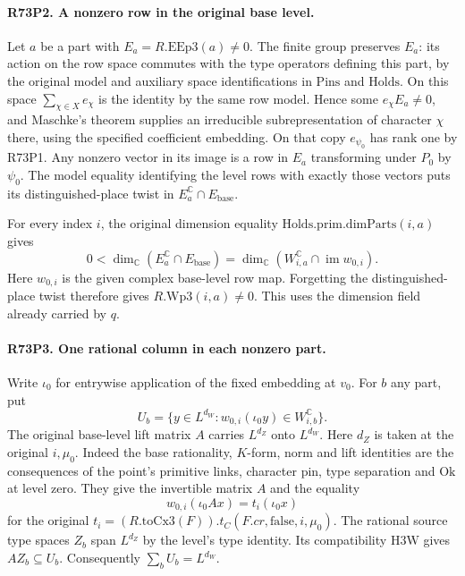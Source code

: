 \paragraph{R73P2. A nonzero row in the original base level.}
\label{claim:R73P2}
Let $a$ be a part with $E_a=R.\mathrm{EEp3}(a)\ne0$. The finite
group preserves $E_a$: its action on the row space commutes with the
type operators defining this part, by the original model and auxiliary
space identifications in $\mathrm{Pins}$ and $\mathrm{Holds}$.
On this space $\sum_{\chi\in X}e_\chi$ is the identity by the same
row model. Hence some $e_\chi E_a\ne0$, and Maschke's theorem supplies
an irreducible subrepresentation of character $\chi$ there, using the
specified coefficient embedding. On that copy $e_{\psi_0}$ has rank one
by R73P1. Any nonzero vector in its image is a row in $E_a$ transforming
under $P_0$ by $\psi_0$. The model equality identifying the level rows
with exactly those vectors puts its distinguished-place twist in
$E_a^{\mathbb C}\cap E_{\mathrm{base}}$.

For every index $i$, the original dimension equality
$\mathrm{Holds}.\mathrm{prim}.\mathrm{dimParts}(i,a)$ gives
\[
 0<\dim_{\mathbb C}(E_a^{\mathbb C}\cap E_{\mathrm{base}})
    =\dim_{\mathbb C}(W_{i,a}^{\mathbb C}\cap\operatorname{im}w_{0,i}).
\]
Here $w_{0,i}$ is the given complex base-level row map. Forgetting
the distinguished-place twist therefore gives $R.\mathrm{Wp3}(i,a)\ne0$.
This uses the dimension field already carried by $q$.

\paragraph{R73P3. One rational column in each nonzero part.}
\label{claim:R73P3}
Write $\iota_0$ for entrywise application of the fixed embedding at
$v_0$. For $b$ any part, put
\[
 U_b=\{y\in L^{d_W}:w_{0,i}(\iota_0 y)\in W_{i,b}^{\mathbb C}\}.
\]
The original base-level lift matrix $A$ carries $L^{d_Z}$ onto
$L^{d_W}$. Here $d_Z$ is taken at the original $i,\mu_0$.
Indeed the base rationality, $K$-form, norm and lift identities are
the consequences of the point's primitive links, character pin,
type separation and $\mathrm{Ok}$ at level zero. They give the invertible
matrix $A$ and the equality
\[
 w_{0,i}(\iota_0 Ax)=t_i(\iota_0 x)
\]
for the original $t_i=(R.\mathrm{toCx3}(F)).t_C(F.cr,\mathrm{false},i,\mu_0)$.
The rational source type spaces $Z_b$ span $L^{d_Z}$ by the
level's type identity. Its compatibility $\mathrm{H3W}$ gives
$A Z_b\subseteq U_b$. Consequently $\sum_b U_b=L^{d_W}$.

